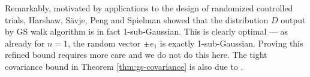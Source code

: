 Remarkably, motivated by applications to the design of randomized controlled trials,  Harshaw, S{\"{a}}vje, Peng and Spielman \cite{HarshawSSW24} showed that the distribution $D$ output by GS walk algorithm is in fact 1-sub-Gaussian. This is clearly optimal --- as already for $n=1$, the random vector $\pm e_1$ is exactly 1-sub-Gaussian. Proving this refined bound requires more care and we do not do this here.
The tight covariance bound in Theorem \ref{thm:gs-covariance} is also due to \cite{HarshawSSW24}.


